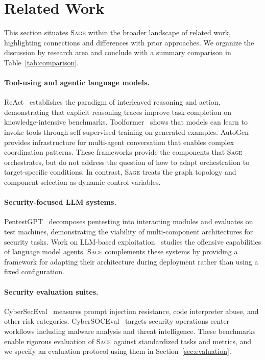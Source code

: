 \documentclass[sigconf,anonymous]{acmart}
\newcommand{\SAGE}{\textsc{Sage}\xspace}
\newcommand{\secref}[1]{Section~\ref{#1}}
\newcommand{\tabref}[1]{Table~\ref{#1}}
\begin{document}
\section{Related Work}
\label{sec:related}

This section situates \SAGE within the broader landscape of related work, highlighting connections and differences with prior approaches. We organize the discussion by research area and conclude with a summary comparison in \tabref{tab:comparison}.

\paragraph{Tool-using and agentic language models.} ReAct~\cite{yao2023react} establishes the paradigm of interleaved reasoning and action, demonstrating that explicit reasoning traces improve task completion on knowledge-intensive benchmarks. Toolformer~\cite{schick2023toolformer} shows that models can learn to invoke tools through self-supervised training on generated examples. AutoGen~\cite{wu2023autogen} provides infrastructure for multi-agent conversation that enables complex coordination patterns. These frameworks provide the components that \SAGE orchestrates, but do not address the question of how to adapt orchestration to target-specific conditions. In contrast, \SAGE treats the graph topology and component selection as dynamic control variables.

\paragraph{Security-focused LLM systems.} PentestGPT~\cite{deng2024pentestgpt} decomposes pentesting into interacting modules and evaluates on test machines, demonstrating the viability of multi-component architectures for security tasks. Work on LLM-based exploitation~\cite{fang2024llmagents} studies the offensive capabilities of language model agents. \SAGE complements these systems by providing a framework for adapting their architecture during deployment rather than using a fixed configuration.

\paragraph{Security evaluation suites.} CyberSecEval~\cite{bhatt2024cyberseceval2,meta2024cyberseceval3} measures prompt injection resistance, code interpreter abuse, and other risk categories. CyberSOCEval~\cite{orlando2024cybersoceval} targets security operations center workflows including malware analysis and threat intelligence. These benchmarks enable rigorous evaluation of \SAGE against standardized tasks and metrics, and we specify an evaluation protocol using them in \secref{sec:evaluation}.
\end{document}
